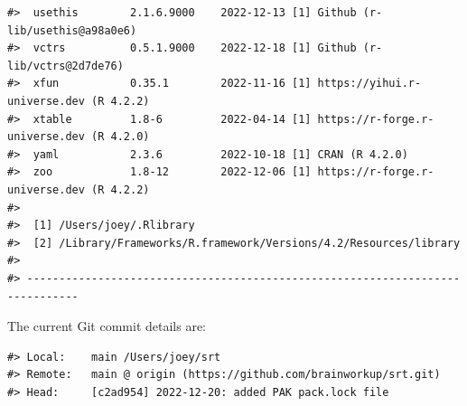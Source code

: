 \documentclass[
  number]{elsarticle}
\begin{document}
\begin{verbatim}
#>  usethis        2.1.6.9000    2022-12-13 [1] Github (r-lib/usethis@a98a0e6)
#>  vctrs          0.5.1.9000    2022-12-18 [1] Github (r-lib/vctrs@2d7de76)
#>  xfun           0.35.1        2022-11-16 [1] https://yihui.r-universe.dev (R 4.2.2)
#>  xtable         1.8-6         2022-04-14 [1] https://r-forge.r-universe.dev (R 4.2.0)
#>  yaml           2.3.6         2022-10-18 [1] CRAN (R 4.2.0)
#>  zoo            1.8-12        2022-12-06 [1] https://r-forge.r-universe.dev (R 4.2.2)
#> 
#>  [1] /Users/joey/.Rlibrary
#>  [2] /Library/Frameworks/R.framework/Versions/4.2/Resources/library
#> 
#> ------------------------------------------------------------------------------
\end{verbatim}

The current Git commit details are:

\begin{verbatim}
#> Local:    main /Users/joey/srt
#> Remote:   main @ origin (https://github.com/brainworkup/srt.git)
#> Head:     [c2ad954] 2022-12-20: added PAK pack.lock file
\end{verbatim}


  
\end{document}
